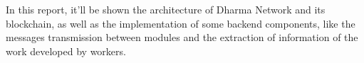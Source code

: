 In this report, it'll be shown the architecture of Dharma Network and its blockchain, as well as the implementation of some backend components, like the messages transmission between modules and the extraction of information of the work developed by workers.

\vspace*{2cm}





